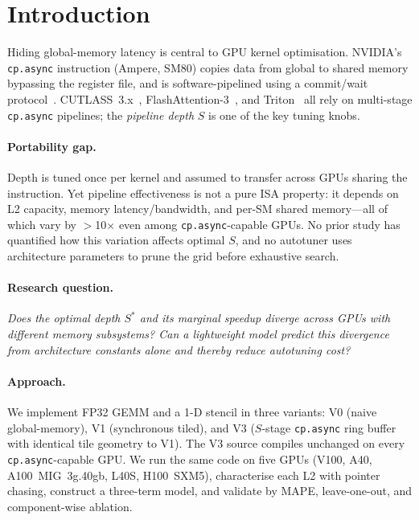 \documentclass[10pt,twocolumn]{article}
\newcommand{\cpasync}{\texttt{cp.async}}
\begin{document}
\section{Introduction}
\label{sec:intro}

Hiding global-memory latency is central to GPU kernel optimisation.
NVIDIA's \cpasync{} instruction (Ampere, SM80) copies data from
global to shared memory bypassing the register file, and is
software-pipelined using a commit/wait protocol~\cite{cuda_guide}.
CUTLASS~3.x~\cite{cutlass3}, FlashAttention-3~\cite{flashattn3}, and
Triton~\cite{triton} all rely on multi-stage \cpasync{} pipelines;
the \emph{pipeline depth} $S$ is one of the key tuning knobs.

\paragraph{Portability gap.}
Depth is tuned once per kernel and assumed to transfer across GPUs
sharing the instruction.  Yet pipeline effectiveness is not a pure
ISA property: it depends on L2 capacity, memory latency/bandwidth,
and per-SM shared memory---all of which vary by $>$10$\times$ even
among \cpasync{}-capable GPUs.  No prior study has quantified how
this variation affects optimal $S$, and no autotuner uses
architecture parameters to prune the grid before exhaustive search.

\paragraph{Research question.}
\emph{Does the optimal depth $S^*$ and its marginal speedup diverge
across GPUs with different memory subsystems?  Can a lightweight
model predict this divergence from architecture constants alone and
thereby reduce autotuning cost?}

\paragraph{Approach.}
We implement FP32 GEMM and a 1-D stencil in three variants: V0
(naive global-memory), V1 (synchronous tiled), and V3 ($S$-stage
\cpasync{} ring buffer with identical tile geometry to V1).  The V3
source compiles unchanged on every \cpasync{}-capable GPU.  We run
the same code on five GPUs (V100, A40, A100~MIG~3g.40gb, L40S,
H100~SXM5), characterise each L2 with pointer chasing, construct a
three-term model, and validate by MAPE, leave-one-out, and
component-wise ablation.
\end{document}
